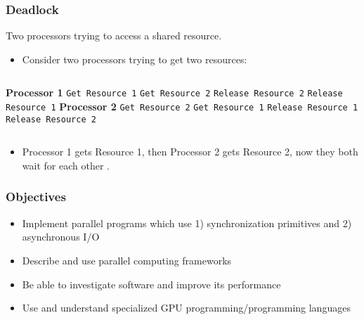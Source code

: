 \begin{frame}[containsverbatim]
  \frametitle{Deadlock}

Two processors trying to access a shared resource.
  \begin{itemize}
    \item Consider two processors trying to get two resources:
  \end{itemize}
  \begin{columns}
      {\bf Processor 1}
      \verb+Get Resource 1+
      \verb+Get Resource 2+
      \verb+Release Resource 2+
      \verb+Release Resource 1+
      {\bf Processor 2}
      \verb+Get Resource 2+
      \verb+Get Resource 1+
      \verb+Release Resource 1+
      \verb+Release Resource 2+
    \end{columns}
  \vfill
  \begin{itemize}
    \item Processor 1 gets Resource 1, then Processor 2 gets Resource 2, now
          they both wait for each other .
  \end{itemize}
\end{frame}

\begin{frame}
  \frametitle{Objectives}

  \begin{itemize}
    \item Implement parallel programs which use 1) synchronization primitives and 2) asynchronous I/O
    \vfill
    \item Describe and use parallel computing frameworks
    \vfill
    \item Be able to investigate software and improve its performance
    \vfill
    \item Use and understand specialized GPU programming/programming languages
  \end{itemize}
\end{frame}


